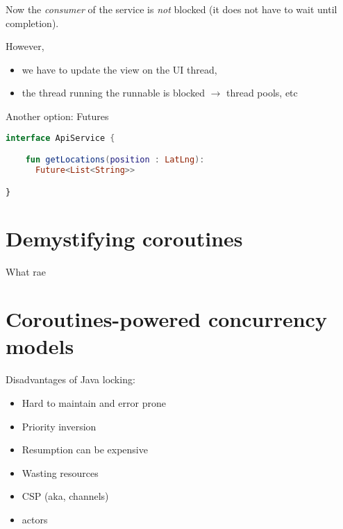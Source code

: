 \documentclass[10pt]{beamer}
\begin{document}
\begin{frame}[fragile]
	Now the \emph{consumer} of the service is \emph{not} blocked (it does not have to wait until completion).

	However, 
	\begin{itemize}
		\item we have to update the view on the UI thread, 
		\item the thread running the runnable is blocked  $\rightarrow$ thread pools, etc
	\end{itemize}

\end{frame}

\begin{frame}[fragile]
	Another option: Futures 
\begin{lstlisting}[language=Kotlin, basicstyle=\ttfamily]
interface ApiService {

    fun getLocations(position : LatLng): 
      Future<List<String>>

}
\end{lstlisting}

\end{frame}
\begin{frame}[fragile]
\end{frame}
\section{Demystifying coroutines}
\begin{frame}
What rae
\end{frame}
\section{Coroutines-powered concurrency models}
\begin{frame}[fragile]
	Disadvantages of Java locking:
	\begin{itemize}
		\item Hard to maintain and error prone
		\item Priority inversion 
		\item Resumption can be expensive 
		\item Wasting resources 
	\end{itemize} 
\end{frame}
\begin{frame}[fragile]
\begin{itemize}
	\item CSP (aka, channels) 
\item actors 
	\end{itemize}
\end{frame}

% 
% 
\end{document}
